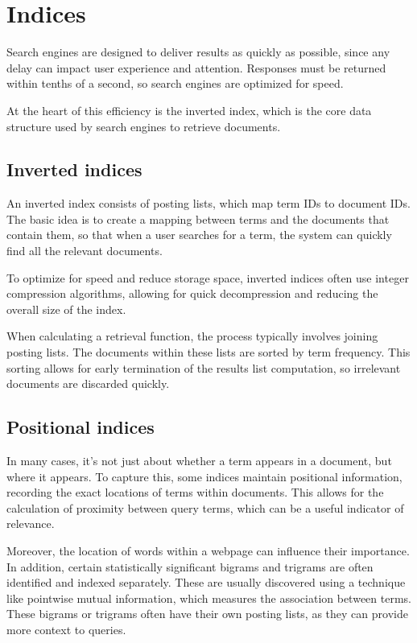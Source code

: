 \section{Indices}
Search engines are designed to deliver results as quickly as possible, since any delay can impact user experience and attention. 
Responses must be returned within tenths of a second, so search engines are optimized for speed.

At the heart of this efficiency is the inverted index, which is the core data structure used by search engines to retrieve documents.

\subsection{Inverted indices}
An inverted index consists of posting lists, which map term IDs to document IDs. 
The basic idea is to create a mapping between terms and the documents that contain them, so that when a user searches for a term, the system can quickly find all the relevant documents.

To optimize for speed and reduce storage space, inverted indices often use integer compression algorithms, allowing for quick decompression and reducing the overall size of the index.

When calculating a retrieval function, the process typically involves joining posting lists. 
The documents within these lists are sorted by term frequency. 
This sorting allows for early termination of the results list computation, so irrelevant documents are discarded quickly.

\subsection{Positional indices}
In many cases, it's not just about whether a term appears in a document, but where it appears. 
To capture this, some indices maintain positional information, recording the exact locations of terms within documents. 
This allows for the calculation of proximity between query terms, which can be a useful indicator of relevance.

Moreover, the location of words within a webpage can influence their importance. 
In addition, certain statistically significant bigrams and trigrams are often identified and indexed separately. 
These are usually discovered using a technique like pointwise mutual information, which measures the association between terms. 
These bigrams or trigrams often have their own posting lists, as they can provide more context to queries.

